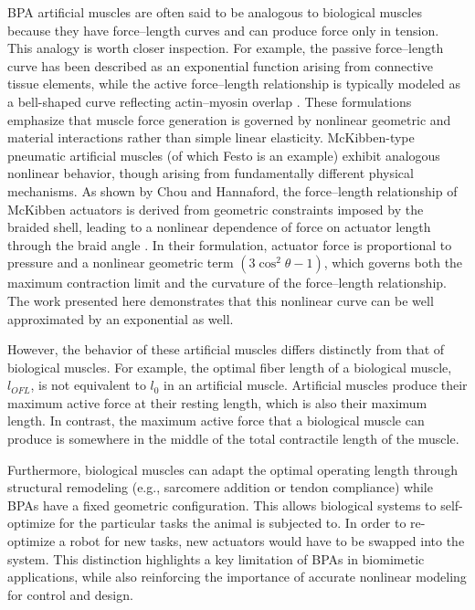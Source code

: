 BPA artificial muscles are often said to be analogous to biological muscles because they have force--length curves and can produce force only in tension. This analogy is worth closer inspection. For example, the passive force–length curve has been described as an exponential function arising from connective tissue elements, while the active force–length relationship is typically modeled as a bell-shaped curve reflecting actin–myosin overlap \citep{winters1990}. These formulations emphasize that muscle force generation is governed by nonlinear geometric and material interactions rather than simple linear elasticity.
McKibben-type pneumatic artificial muscles (of which Festo is an example) exhibit analogous nonlinear behavior, though arising from fundamentally different physical mechanisms. As shown by Chou and Hannaford, the force--length relationship of McKibben actuators is derived from geometric constraints imposed by the braided shell, leading to a nonlinear dependence of force on actuator length through the braid angle \citep{chou_measurement_1996}. In their formulation, actuator force is proportional to pressure and a nonlinear geometric term $(3\cos^2\theta - 1)$, which governs both the maximum contraction limit and the curvature of the force--length relationship. The work presented here demonstrates that this nonlinear curve can be well approximated by an exponential as well.

However, the behavior of these artificial muscles differs distinctly from that of biological muscles.
For example, the optimal fiber length of a biological muscle, $l_{OFL}$, is not equivalent to $l_0$ in an artificial muscle. Artificial muscles produce their maximum active force at their resting length, which is also their maximum length. In contrast, the maximum active force that a biological muscle can produce is somewhere in the middle of the total contractile length of the muscle. 

Furthermore, biological muscles can adapt the optimal operating length through structural remodeling (e.g., sarcomere addition or tendon compliance) while BPAs have a fixed geometric configuration. This allows biological systems to self-optimize for the particular tasks the animal is subjected to. In order to re-optimize a robot for new tasks, new actuators would have to be swapped into the system. This distinction highlights a key limitation of BPAs in biomimetic applications, while also reinforcing the importance of accurate nonlinear modeling for control and design.

